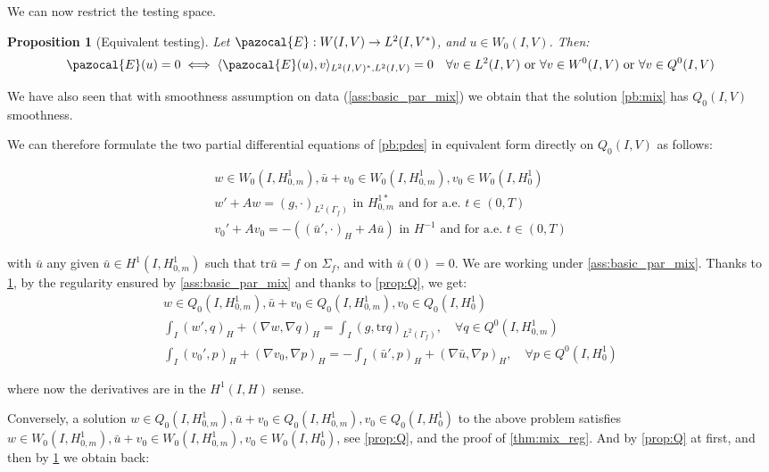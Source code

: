 \documentclass[english,a4paper,10pt,oneside]{scrbook}	%
\theoremstyle{break}
\newtheorem{prop}[equation]{Proposition}
\theoremstyle{remark}
\newcommand{\tr}{\text{tr}}
\begin{document}
\begin{appendices}
We can now restrict the testing space.

\begin{prop}[Equivalent testing]
\label{prop:eq_test}
Let $\pazocal{E}: W(I,V)\rightarrow L^2(I,V^*)$, and $u\in W_0(I,V)$. Then:
\begin{align*}
\pazocal{E}(u)=0 
\iff 
\langle \pazocal{E}(u), v\rangle_{L^2(I,V)^*, L^2(I,V)}=0 \quad \forall v \in L^2(I,V) \text{ or }\forall v \in W^0(I,V) \text{ or } \forall v \in Q^0(I,V) 
\end{align*}

\end{prop}

We have also seen that with smoothness assumption on data (\cref{ass:basic_par_mix}) we obtain that the solution \cref{pb:mix} has $Q_0(I,V)$ smoothness. 

We can therefore formulate the two partial differential equations of \cref{pb:pdes} in equivalent form directly on $Q_0(I,V)$ as follows:

\begin{align*}
w \in W_0(I, H^1_{0,m}),\bar{u}+v_0 \in W_0(I,H^1_{0,m}), v_0 \in W_0(I,H^1_0)\\
w' + A w = (g,\cdot)_{L^2(\Gamma_f)} \text{ in }H^{1*}_{0,m} \text{ and for a.e. } t \in (0,T) \\
v_0' + A v_0 = -((\bar{u}',\cdot)_H+A \bar{u}) \text{ in }H^{-1} \text{ and for a.e. } t \in (0,T) 
\end{align*}

with $\bar{u}$ any given $\bar{u}\in H^1(I,H^1_{0,m})$ such that $\tr \bar{u} =f$ on $\Sigma_f$, and with $\bar{u}(0)=0$.
We are working under \cref{ass:basic_par_mix}.
Thanks to \cref{prop:eq_test}, by the regularity ensured by \cref{ass:basic_par_mix} and thanks to \cref{prop:Q}, we get:
\begin{align*}
w \in Q_0(I, H^1_{0,m}), \bar{u}+v_0 \in Q_0(I,H^1_{0,m}), v_0 \in Q_0(I,H^1_0) \\
\int_I ( w' , q)_H+ (\nabla w, \nabla q)_H = \int_I(g,\tr q)_{L^2(\Gamma_f)}, \quad \forall q \in Q^0(I, H^1_{0,m}) \\
\int_I (v_0',p)_H + (\nabla v_0, \nabla p)_H= -\int_I(\bar{u}',p)_H+(\nabla \bar{u}, \nabla p)_H, \quad \forall p \in Q^0(I, H^1_0) 
\end{align*}

where now the derivatives are in the $H^1(I,H)$ sense.

Conversely, a solution $w \in Q_0(I, H^1_{0,m}), \bar{u}+v_0 \in Q_0(I,H^1_{0,m}), v_0 \in Q_0(I,H^1_0) $ to the above problem satisfies $w \in W_0(I, H^1_{0,m}), \bar{u}+v_0 \in W_0(I,H^1_{0,m}), v_0 \in W_0(I,H^1_0)$, see \cref{prop:Q}, and the proof of \cref{thm:mix_reg}. And by \cref{prop:Q} at first, and then by \cref{prop:eq_test} we obtain back:


\end{appendices}
\end{document}
